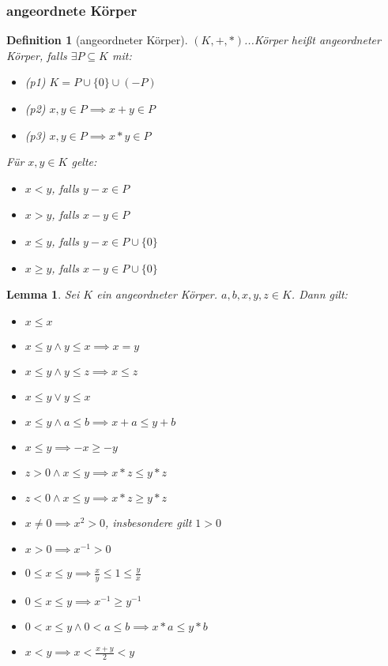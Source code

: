 \documentclass[twocolumn]{article}
\newtheorem{lemma}[theorem]{Lemma}
\newtheorem{definition}{Definition}[section]
\begin{document}
\subsubsection{angeordnete Körper}
\begin{definition}[angeordneter Körper]
	$(K,+,*)$...Körper heißt angeordneter Körper, falls $\exists P \subseteq K$ mit:
	\begin{itemize}
		\item (p1) $K=P\cup \{0\} \cup (-P)$
		\item (p2) $x,y \in P \implies x + y \in P$
		\item (p3) $x,y \in P \implies x * y \in P$
	\end{itemize}

	Für $x,y \in K$ gelte:
	\begin{itemize}
		\item $x<y$, falls $y - x \in P$
		\item $x>y$, falls $x - y \in P$
		\item $x\leq y$, falls $y - x \in P \cup \{0\}$
		\item $x\geq y$, falls $x - y \in P \cup \{0\}$
	\end{itemize}
\end{definition}

\begin{lemma}
	Sei $K$ ein angeordneter Körper. $a,b,x,y,z \in K$. Dann gilt:
	\begin{itemize}
		\item $x \leq x$
		\item $x \leq y \land y \leq x \implies x = y$
		\item $x \leq y \land y \leq z \implies x \leq z$
		\item $x \leq y \lor y \leq x$
		\item $x \leq y \land a \leq b \implies x + a \leq y + b$
		\item $x \leq y \implies -x \geq -y$
		\item $z > 0 \land x \leq y \implies x * z \leq y * z$
		\item $z < 0 \land x \leq y \implies x * z \geq y * z$
		\item $x \neq 0 \implies x^{2} > 0$, insbesondere gilt $1 > 0$
		\item $x > 0 \implies x^{-1}>0$
		\item $0 \leq x \leq y \implies \frac{x}{y} \leq 1 \leq \frac{y}{x}$
		\item $0 \leq x \leq y \implies x^{-1} \geq y^{-1}$
		\item $0 < x \leq y \land 0 < a \leq b \implies x * a \leq y * b$
		\item $x < y \implies x < \frac{x + y}{2} < y$
	\end{itemize}
\end{lemma}
\end{document}
